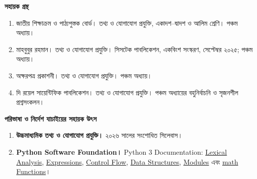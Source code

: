 \label{sources}
\vspace{1mm}
{\Large\bfseries\color{darkTeal}সহায়ক গ্রন্থ}\par
\vspace{0.1mm}{\color{accentOrange}\rule{\linewidth}{0.6pt}}\vspace{0.5mm}

\begin{enumerate}
\item জাতীয় শিক্ষাক্রম ও পাঠ্যপুস্তক বোর্ড। তথ্য ও যোগাযোগ প্রযুক্তি, একাদশ--দ্বাদশ ও আলিম শ্রেণি। পঞ্চম অধ্যায়।
\item মাহবুবুর রহমান। তথ্য ও যোগাযোগ প্রযুক্তি। সিসটেক পাবলিকেশন, একবিংশ সংস্করণ, সেপ্টেম্বর ২০২৫; পঞ্চম অধ্যায়।
\item অক্ষরপত্র প্রকাশনী। তথ্য ও যোগাযোগ প্রযুক্তি। পঞ্চম অধ্যায়।
\item দি রয়েল সায়েন্টিফিক পাবলিকেশন। তথ্য ও যোগাযোগ প্রযুক্তি। পঞ্চম অধ্যায়ের বহুনির্বাচনি ও সৃজনশীল প্রশ্নসংকলন।
\end{enumerate}

\vspace{0.8mm}
{\normalsize\bfseries\color{deepOrange}পরিভাষা ও নির্দেশ যাচাইয়ের সহায়ক উৎস}\par
\vspace{0.1mm}

\begin{enumerate}
\item \textbf{উচ্চমাধ্যমিক তথ্য ও যোগাযোগ প্রযুক্তি।} ২০২৬ সালের সংশোধিত সিলেবাস।
\item \textbf{Python Software Foundation।} Python 3 Documentation:
\href{https://docs.python.org/3/reference/lexical_analysis.html}{Lexical Analysis},
\href{https://docs.python.org/3/reference/expressions.html}{Expressions},
\href{https://docs.python.org/3/tutorial/controlflow.html}{Control Flow},
\href{https://docs.python.org/3/tutorial/datastructures.html}{Data Structures},
\href{https://docs.python.org/3/tutorial/modules.html}{Modules} এবং
\href{https://docs.python.org/3/library/math.html}{math Functions}।
\end{enumerate}

